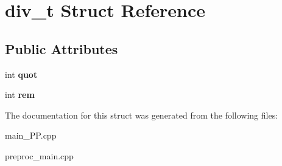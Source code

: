 \hypertarget{structdiv__t}{\section{div\+\_\+t Struct Reference}
\label{structdiv__t}
}
\subsection*{Public Attributes}
\begin{DoxyCompactItemize}
\item 
\hypertarget{structdiv__t_a0b9dda2884048daa68ca4aaa12b17b9a}{int {\bfseries quot}}\label{structdiv__t_a0b9dda2884048daa68ca4aaa12b17b9a}

\item 
\hypertarget{structdiv__t_ac64389de252de53eda8b4f8dbb7c623f}{int {\bfseries rem}}\label{structdiv__t_ac64389de252de53eda8b4f8dbb7c623f}

\end{DoxyCompactItemize}


The documentation for this struct was generated from the following files\+:\begin{DoxyCompactItemize}
\item 
main\+\_\+\+P\+P.\+cpp\item 
preproc\+\_\+main.\+cpp\end{DoxyCompactItemize}
